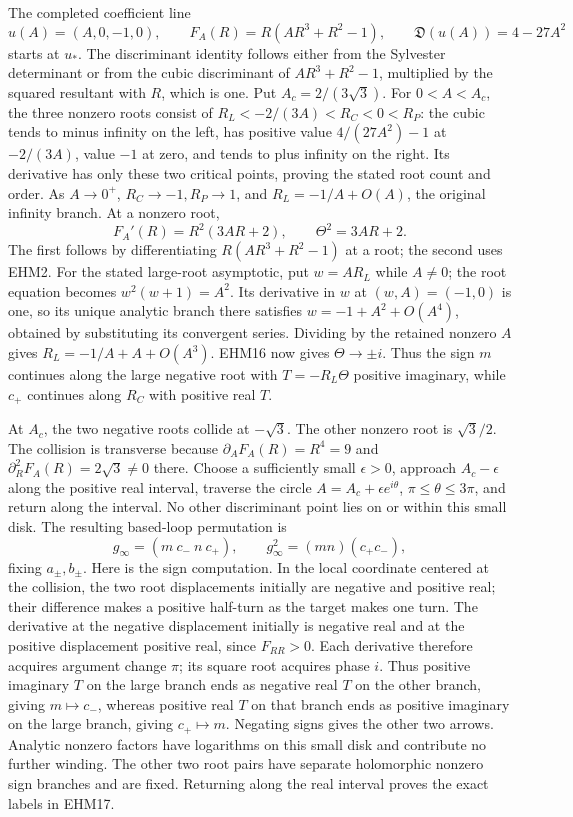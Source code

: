 \documentclass[
  10pt,
  a4paper,
]{article}
\begin{document}
The completed coefficient line \[
u(A)=(A,0,-1,0),\qquad
F_A(R)=R(AR^3+R^2-1),\qquad
\mathfrak D(u(A))=4-27A^2
\tag{EHM15}
\] starts at \(u_*\). The discriminant identity follows either from the
Sylvester determinant or from the cubic discriminant of \(AR^3+R^2-1\),
multiplied by the squared resultant with \(R\), which is one. Put
\(A_c=2/(3\sqrt3)\). For \(0<A<A_c\), the three nonzero roots consist of
\(R_L<-2/(3A)<R_C<0<R_P\): the cubic tends to minus infinity on the
left, has positive value \(4/(27A^2)-1\) at \(-2/(3A)\), value \(-1\) at
zero, and tends to plus infinity on the right. Its derivative has only
these two critical points, proving the stated root count and order. As
\(A\to0^+\), \(R_C\to-1,R_P\to1\), and \(R_L=-1/A+O(A)\), the original
infinity branch. At a nonzero root, \[
F_A'(R)=R^2(3AR+2),\qquad
\Theta^2=3AR+2.
\tag{EHM16}
\] The first follows by differentiating \(R(AR^3+R^2-1)\) at a root; the
second uses EHM2. For the stated large-root asymptotic, put \(w=AR_L\)
while \(A\ne0\); the root equation becomes \(w^2(w+1)=A^2\). Its
derivative in \(w\) at \((w,A)=(-1,0)\) is one, so its unique analytic
branch there satisfies \(w=-1+A^2+O(A^4)\), obtained by substituting its
convergent series. Dividing by the retained nonzero \(A\) gives
\(R_L=-1/A+A+O(A^3)\). EHM16 now gives \(\Theta\to\pm i\). Thus the sign
\(m\) continues along the large negative root with \(T=-R_L\Theta\)
positive imaginary, while \(c_+\) continues along \(R_C\) with positive
real \(T\).

At \(A_c\), the two negative roots collide at \(-\sqrt3\). The other
nonzero root is \(\sqrt3/2\). The collision is transverse because
\(\partial_A F_A(R)=R^4=9\) and \(\partial_R^2F_A(R)=2\sqrt3\ne0\)
there. Choose a sufficiently small \(\epsilon>0\), approach
\(A_c-\epsilon\) along the positive real interval, traverse the circle
\(A=A_c+\epsilon e^{i\theta}\), \(\pi\le\theta\le3\pi\), and return
along the interval. No other discriminant point lies on or within this
small disk. The resulting based-loop permutation is \[
g_\infty=(m\ c_-\ n\ c_+),\qquad
g_\infty^2=(mn)(c_+c_-),
\tag{EHM17}
\] fixing \(a_\pm,b_\pm\). Here is the sign computation. In the local
coordinate centered at the collision, the two root displacements
initially are negative and positive real; their difference makes a
positive half-turn as the target makes one turn. The derivative at the
negative displacement initially is negative real and at the positive
displacement positive real, since \(F_{RR}>0\). Each derivative
therefore acquires argument change \(\pi\); its square root acquires
phase \(i\). Thus positive imaginary \(T\) on the large branch ends as
negative real \(T\) on the other branch, giving \(m\mapsto c_-\),
whereas positive real \(T\) on that branch ends as positive imaginary on
the large branch, giving \(c_+\mapsto m\). Negating signs gives the
other two arrows. Analytic nonzero factors have logarithms on this small
disk and contribute no further winding. The other two root pairs have
separate holomorphic nonzero sign branches and are fixed. Returning
along the real interval proves the exact labels in EHM17.
\end{document}
